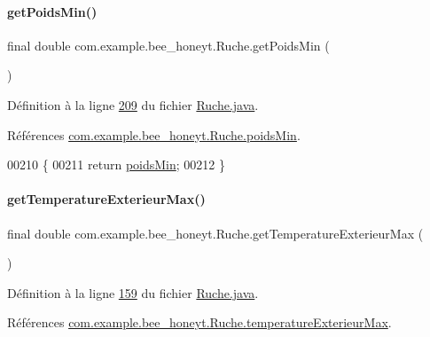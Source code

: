 \paragraph{\texorpdfstring{get\+Poids\+Min()}{getPoidsMin()}}
{\footnotesize\ttfamily final double com.\+example.\+bee\+\_\+honeyt.\+Ruche.\+get\+Poids\+Min (\begin{DoxyParamCaption}{ }\end{DoxyParamCaption})}



Définition à la ligne \hyperlink{_ruche_8java_source_l00209}{209} du fichier \hyperlink{_ruche_8java_source}{Ruche.\+java}.



Références \hyperlink{_ruche_8java_source_l00033}{com.\+example.\+bee\+\_\+honeyt.\+Ruche.\+poids\+Min}.


\begin{DoxyCode}
00210     \{
00211         \textcolor{keywordflow}{return} \hyperlink{classcom_1_1example_1_1bee__honeyt_1_1_ruche_a3408f099f2fab8700353e6e266fe8221}{poidsMin};
00212     \}
\end{DoxyCode}
\mbox{\label{classcom_1_1example_1_1bee__honeyt_1_1_ruche_a9fbd64d989fba4ae535329192a2396ff}} 
\paragraph{\texorpdfstring{get\+Temperature\+Exterieur\+Max()}{getTemperatureExterieurMax()}}
{\footnotesize\ttfamily final double com.\+example.\+bee\+\_\+honeyt.\+Ruche.\+get\+Temperature\+Exterieur\+Max (\begin{DoxyParamCaption}{ }\end{DoxyParamCaption})}



Définition à la ligne \hyperlink{_ruche_8java_source_l00159}{159} du fichier \hyperlink{_ruche_8java_source}{Ruche.\+java}.



Références \hyperlink{_ruche_8java_source_l00028}{com.\+example.\+bee\+\_\+honeyt.\+Ruche.\+temperature\+Exterieur\+Max}.



